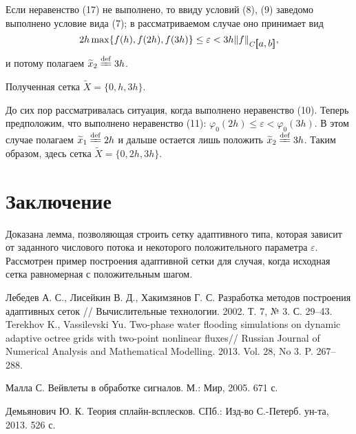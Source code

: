 \documentclass{spisok-article}
\begin{document}
       Если неравенство (17) не выполнено, то ввиду условий
        (8), (9) заведомо выполнено условие вида (7); в
    рассматриваемом случае оно принимает вид
     $$2h\max\{f(h),f(2h),f(3h)\}\leq \varepsilon<
     3h\|f\|_{C\hbox{$[\hspace{-2pt}[$$a,b$$]\hspace{-2pt}]$}},
        $$
     и потому полагаем $\widetilde x_2\stackrel{\rm def}{=\kern-3.6pt=} 3h$.
     
     Полученная сетка  $\widetilde X=\{0,h,3h\}$.

     До сих пор рассматривалась ситуация, когда выполнено
      неравенство (10). Теперь предположим, что выполнено
      неравенство (11):
      $\varphi_0(2h)\leq \varepsilon <\varphi_0(3h).
      $
      В этом случае полагаем $\widetilde x_1 \stackrel{\rm def}{=\kern-3.6pt=} 2h$ и дальше остается лишь положить
      $\widetilde x_2\stackrel{\rm def}{=\kern-3.6pt=} 3h$. Таким образом, здесь сетка $\widetilde
      {X}=\{0,2h,3h\}$.

      \section{Заключение}
      Доказана лемма, позволяющая строить сетку адаптивного типа, которая зависит от заданного числового потока и некоторого положительного параметра $\varepsilon$. Рассмотрен пример построения адаптивной сетки для случая, когда исходная сетка равномерная с положительным шагом.

\newpage
\renewcommand\refname{Литература}
\begin{thebibliography}{8}

 Лебедев А. С., Лисейкин В. Д., Хакимзянов Г. С. Разработка
    методов построения адаптивных сеток // Вычислительные технологии. 2002.
    Т. 7, № 3. С. 29--43.
 Terekhov K., Vassilevski Yu. Two-phase water
    flooding simu\-la\-tions on dynamic adaptive octree grids with
    two-point nonlinear fluxes// Russian Journal of Numerical Analysis
    and Mathematical Modelling. 2013. Vol. 28, No 3. P. 267--288.

 Малла С. Вейвлеты в обработке сигналов. М.: Мир, 2005. 671 с.

 Демьянович Ю. К. Теория сплайн-всплесков. СПб.: Изд-во \linebreak С.-Петерб. ун-та, 2013. 526 с.

\end{thebibliography}
\end{document}
